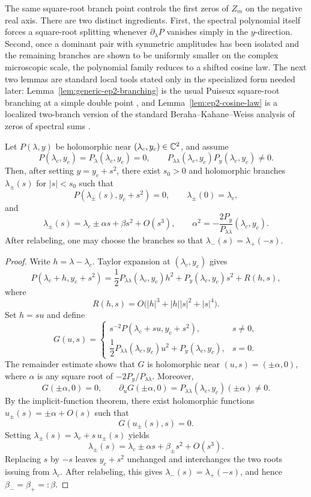 The same square-root branch point controls the first zeros of \(Z_m\) on the negative real axis.
There are two distinct ingredients.
First, the spectral polynomial itself forces a square-root splitting whenever \(\partial_\lambda P\) vanishes simply in the \(y\)-direction.
Second, once a dominant pair with symmetric amplitudes has been isolated and the remaining branches are shown to be uniformly smaller on the complex microscopic scale, the polynomial family reduces to a shifted cosine law.
The next two lemmas are standard local tools stated only in the specialized form needed later:
Lemma~\ref{lem:generic-ep2-branching} is the usual Puiseux square-root branching at a simple double point \cite{Walker1950,BrieskornKnorrer1986}, and Lemma~\ref{lem:ep2-cosine-law} is a localized two-branch version of the standard Beraha--Kahane--Weiss analysis of zeros of spectral sums \cite{BerahaKahaneWeiss1975,BerahaKahaneWeiss1978,Sokal2004}.

\begin{lemma}\label{lem:generic-ep2-branching}
Let \(P(\lambda,y)\) be holomorphic near \((\lambda_c,y_c)\in\mathbb{C}^2\), and assume
\[
P(\lambda_c,y_c)=P_\lambda(\lambda_c,y_c)=0,
\qquad
P_{\lambda\lambda}(\lambda_c,y_c)P_y(\lambda_c,y_c)\neq 0.
\]
Then, after setting \(y=y_c+s^2\), there exist \(s_0>0\) and holomorphic branches \(\lambda_\pm(s)\) for \(|s|<s_0\) such that
\[
P(\lambda_\pm(s),y_c+s^2)=0,
\qquad
\lambda_\pm(0)=\lambda_c,
\]
and
\[
\lambda_\pm(s)=\lambda_c\pm \alpha s+\beta s^2+O(s^3),
\qquad
\alpha^2=-\frac{2P_y}{P_{\lambda\lambda}}(\lambda_c,y_c).
\]
After relabeling, one may choose the branches so that \(\lambda_-(s)=\lambda_+(-s)\).
\end{lemma}

\begin{proof}
Write \(h=\lambda-\lambda_c\).
Taylor expansion at \((\lambda_c,y_c)\) gives
\[
P(\lambda_c+h,y_c+s^2)
=
\frac{1}{2}P_{\lambda\lambda}(\lambda_c,y_c)h^2
+P_y(\lambda_c,y_c)s^2
+R(h,s),
\]
where
\[
R(h,s)=O\!\bigl(|h|^3+|h||s|^2+|s|^4\bigr).
\]
Set \(h=su\) and define
\[
G(u,s)=
\begin{cases}
s^{-2}P(\lambda_c+su,y_c+s^2), & s\neq 0,\\[4pt]
\dfrac{1}{2}P_{\lambda\lambda}(\lambda_c,y_c)u^2+P_y(\lambda_c,y_c), & s=0.
\end{cases}
\]
The remainder estimate shows that \(G\) is holomorphic near \((u,s)=(\pm\alpha,0)\), where \(\alpha\) is any square root of \(-2P_y/P_{\lambda\lambda}\).
Moreover,
\[
G(\pm\alpha,0)=0,
\qquad
\partial_u G(\pm\alpha,0)=P_{\lambda\lambda}(\lambda_c,y_c)(\pm\alpha)\neq 0.
\]
By the implicit-function theorem, there exist holomorphic functions \(u_\pm(s)=\pm\alpha+O(s)\) such that
\[
G(u_\pm(s),s)=0.
\]
Setting \(\lambda_\pm(s)=\lambda_c+s\,u_\pm(s)\) yields
\[
\lambda_\pm(s)=\lambda_c\pm\alpha s+\beta_\pm s^2+O(s^3).
\]
Replacing \(s\) by \(-s\) leaves \(y_c+s^2\) unchanged and interchanges the two roots issuing from \(\lambda_c\).
After relabeling, this gives \(\lambda_-(s)=\lambda_+(-s)\), and hence \(\beta_-=\beta_+=:\beta\).
\end{proof}

